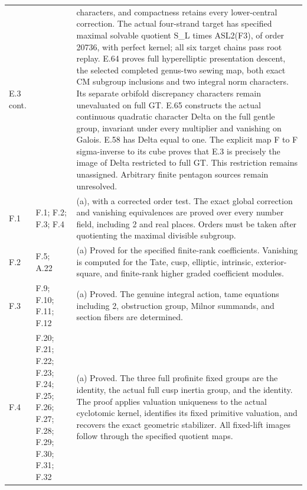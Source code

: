 \begin{longtable}{@{}p{1.1cm}p{3.0cm}p{10.3cm}@{}}
E.3 cont. &  & characters, and compactness retains every lower-central correction. The actual four-strand target has specified maximal solvable quotient S\_L times ASL2(F3), of order 20736, with perfect kernel; all six target chains pass root replay. E.64 proves full hyperelliptic presentation descent, the selected completed genus-two sewing map, both exact CM subgroup inclusions and two integral norm characters. Its separate orbifold discrepancy characters remain unevaluated on full GT. E.65 constructs the actual continuous quadratic character Delta on the full gentle group, invariant under every multiplier and vanishing on Galois. E.58 has Delta equal to one. The explicit map F to F sigma-inverse to its cube proves that E.3 is precisely the image of Delta restricted to full GT. This restriction remains unassigned. Arbitrary finite pentagon sources remain unresolved. \\
F.1 & F.1; F.2; F.3; F.4 & (a), with a corrected order test. The exact global correction and vanishing equivalences are proved over every number field, including 2 and real places. Orders must be taken after quotienting the maximal divisible subgroup. \\
F.2 & F.5; A.22 & (a) Proved for the specified finite-rank coefficients. Vanishing is computed for the Tate, cusp, elliptic, intrinsic, exterior-square, and finite-rank higher graded coefficient modules. \\
F.3 & F.9; F.10; F.11; F.12 & (a) Proved. The genuine integral action, tame equations including 2, obstruction group, Milnor summands, and section fibers are determined. \\
F.4 & F.20; F.21; F.22; F.23; F.24; F.25; F.26; F.27; F.28; F.29; F.30; F.31; F.32 & (a) Proved. The three full profinite fixed groups are the identity, the actual full cusp inertia group, and the identity. The proof applies valuation uniqueness to the actual cyclotomic kernel, identifies its fixed primitive valuation, and recovers the exact geometric stabilizer. All fixed-lift images follow through the specified quotient maps. \\
\bottomrule\end{longtable}
